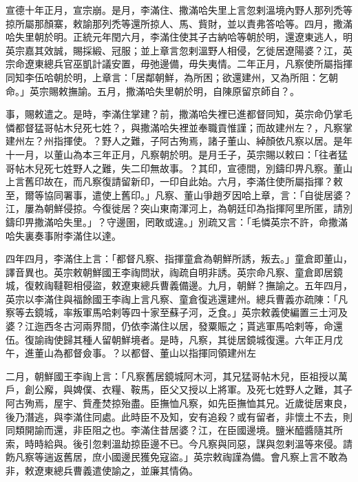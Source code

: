\begin{pinyinscope}
宣德十年正月，宣宗崩。是月，李滿住、撒滿哈失里上言忽剌溫境內野人那列禿等掠所屬那顏寨，敕諭那列禿等還所掠人、馬、貲財，並以責弗答哈等。四月，撒滿哈失里朝於明。正統元年閏六月，李滿住使其子古納哈等朝於明，還遼東逃人，明英宗嘉其效誠，賜採緞、冠服；並上章言忽剌溫野人相侵，乞徙居遼陽婆？江，英宗命遼東總兵官巫凱計議安置，毋弛邊備，毋失夷情。二年正月，凡察使所屬指揮同知李伍哈朝於明，上章言：「居鄰朝鮮，為所困；欲還建州，又為所阻：乞朝命。」英宗賜敕撫諭。五月，撒滿哈失里朝於明，自陳原留京師自？。

事，賜敕遣之。是時，李滿住掌建？前，撒滿哈失裡已進都督同知，英宗命仍掌毛憐都督猛哥帖木兒死七姓？，與撒滿哈失裡並奉職貢惟謹；而故建州左？，凡察掌建州左？州指揮使。？野人之難，子阿古殉焉，諸子董山、綽顏依凡察以居。是年十一月，以董山為本三年正月，凡察朝於明。是月壬子，英宗賜以敕曰：「往者猛哥帖木兒死七姓野人之難，失二印無故事。？其印，宣德間，別鑄印畀凡察。董山上言舊印故在，而凡察復請留新印，一印自此始。六月，李滿住使所屬指揮？敕至，爾等協同署事，遣使上舊印。」凡察、董山爭趙歹因哈上章，言：「自徙居婆？江，屢為朝鮮侵掠。今復徙居？突山東南渾河上，為朝廷印為指揮阿里所匿，請別鑄印畀撒滿哈失里。」？守邊圉，罔敢或違。」別疏又言：「毛憐英宗不許，命撒滿哈失裏奏事附李滿住以達。

四年四月，李滿住上言：「都督凡察、指揮童倉為朝鮮所誘，叛去。」童倉即董山，譯音異也。英宗敕朝鮮國王李祹問狀，祹疏自明非誘。英宗命凡察、童倉即居鏡城，復敕祹韃靼相侵盜，敕遼東總兵曹義備邊。九月，朝鮮？撫諭之。五年四月，英宗以李滿住與福餘國王李祹上言凡察、童倉復逃還建州。總兵曹義亦疏陳：「凡察等去鏡城，率叛軍馬哈剌等四十家至蘇子河，乏食。」英宗敕義使編置三土河及婆？江迤西冬古河兩界間，仍依李滿住以居，發粟賑之；貰逃軍馬哈剌等，命還伍。復諭祹使歸其種人留朝鮮境者。是時，凡察，其徙居鏡城復還。六年正月戊午，進董山為都督僉事。？以都督、董山以指揮同領建州左

二月，朝鮮國王李祹上言：「凡察舊居鏡城阿木河，其兄猛哥帖木兒，臣祖授以萬戶，創公廨，與婢僕、衣糧、鞍馬，臣父又授以上將軍。及死七姓野人之難，其子阿古殉焉，屋宇、貲產焚掠殆盡。臣撫恤凡察，如先臣撫恤其兄。近歲徙居東良，後乃潛逃，與李滿住同處。此時臣不及知，安有追殺？或有留者，非懷土不去，則同類開諭而還，非臣阻之也。李滿住昔居婆？江，在臣國邊境。鹽米醯醬隨其所索，時時給與。後引忽剌溫劫掠臣邊不已。今凡察與同惡，謀與忽剌溫等來侵。請飭凡察等遄返舊居，庶小國邊民獲免寇盜。」英宗敕祹謹為備。會凡察上言不敢為非，敕遼東總兵曹義遣使諭之，並廉其情偽。


\end{pinyinscope}
